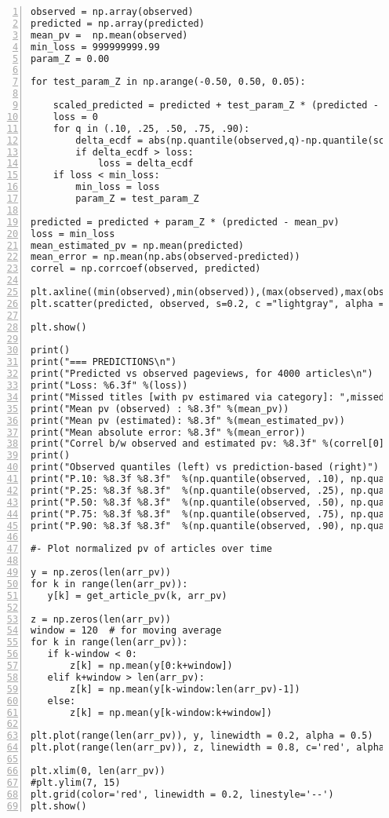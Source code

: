 \documentclass[oneside,10pt]{book}
\begin{document}
\begin{lstlisting}[numbers=left]
observed = np.array(observed)
predicted = np.array(predicted)
mean_pv =  np.mean(observed)
min_loss = 999999999.99
param_Z = 0.00

for test_param_Z in np.arange(-0.50, 0.50, 0.05):

    scaled_predicted = predicted + test_param_Z * (predicted - mean_pv)
    loss = 0
    for q in (.10, .25, .50, .75, .90):
        delta_ecdf = abs(np.quantile(observed,q)-np.quantile(scaled_predicted,q))
        if delta_ecdf > loss:
            loss = delta_ecdf
    if loss < min_loss:
        min_loss = loss
        param_Z = test_param_Z

predicted = predicted + param_Z * (predicted - mean_pv)
loss = min_loss    
mean_estimated_pv = np.mean(predicted)
mean_error = np.mean(np.abs(observed-predicted))
correl = np.corrcoef(observed, predicted)

plt.axline((min(observed),min(observed)),(max(observed),max(observed)),c='red')
plt.scatter(predicted, observed, s=0.2, c ="lightgray", alpha = 1.0)

plt.show()

print()
print("=== PREDICTIONS\n")
print("Predicted vs observed pageviews, for 4000 articles\n")
print("Loss: %6.3f" %(loss))
print("Missed titles [with pv estimared via category]: ",missed, "out of", n)
print("Mean pv (observed) : %8.3f" %(mean_pv)) 
print("Mean pv (estimated): %8.3f" %(mean_estimated_pv)) 
print("Mean absolute error: %8.3f" %(mean_error)) 
print("Correl b/w observed and estimated pv: %8.3f" %(correl[0][1]))
print()
print("Observed quantiles (left) vs prediction-based (right)")
print("P.10: %8.3f %8.3f"  %(np.quantile(observed, .10), np.quantile(predicted, .10)))
print("P.25: %8.3f %8.3f"  %(np.quantile(observed, .25), np.quantile(predicted, .25)))
print("P.50: %8.3f %8.3f"  %(np.quantile(observed, .50), np.quantile(predicted, .50)))
print("P.75: %8.3f %8.3f"  %(np.quantile(observed, .75), np.quantile(predicted, .75)))
print("P.90: %8.3f %8.3f"  %(np.quantile(observed, .90), np.quantile(predicted, .90)))

#- Plot normalized pv of articles over time

y = np.zeros(len(arr_pv))
for k in range(len(arr_pv)):
   y[k] = get_article_pv(k, arr_pv)

z = np.zeros(len(arr_pv))
window = 120  # for moving average
for k in range(len(arr_pv)):
   if k-window < 0:
       z[k] = np.mean(y[0:k+window])
   elif k+window > len(arr_pv):
       z[k] = np.mean(y[k-window:len(arr_pv)-1])
   else:
       z[k] = np.mean(y[k-window:k+window])
   
plt.plot(range(len(arr_pv)), y, linewidth = 0.2, alpha = 0.5)
plt.plot(range(len(arr_pv)), z, linewidth = 0.8, c='red', alpha = 1.0)

plt.xlim(0, len(arr_pv))
#plt.ylim(7, 15)
plt.grid(color='red', linewidth = 0.2, linestyle='--')
plt.show()

\end{lstlisting}
\end{document}

